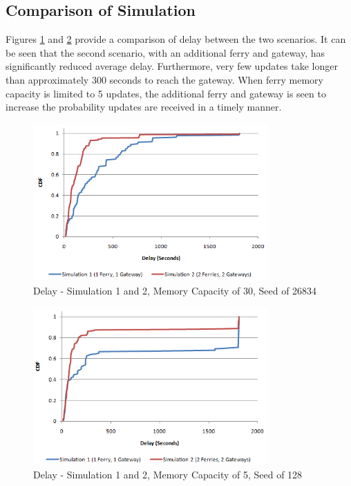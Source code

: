 \subsection{Comparison of Simulation}

Figures \ref{fig:result_delay_both_128_mc30} and \ref{fig:result_delay_both_128_mc5} provide a comparison of delay between the two scenarios.
It can be seen that the second scenario, with an additional ferry and gateway, has significantly reduced average delay.
Furthermore, very few updates take longer than approximately 300 seconds to reach the gateway.
When ferry memory capacity is limited to 5 updates, the additional ferry and gateway is seen to increase the probability updates are received in a timely manner.

\begin{figure}[htbp]
    \centering
    \includegraphics[width=0.8\textwidth]{images/result_delay_both_128_mc30}
    \caption{Delay - Simulation 1 and 2, Memory Capacity of 30, Seed of 26834}
    \label{fig:result_delay_both_128_mc30}
\end{figure}


\begin{figure}[htbp]
    \centering
    \includegraphics[width=0.8\textwidth]{images/result_delay_both_128_mc5}
    \caption{Delay - Simulation 1 and 2, Memory Capacity of 5, Seed of 128}
    \label{fig:result_delay_both_128_mc5}
\end{figure}